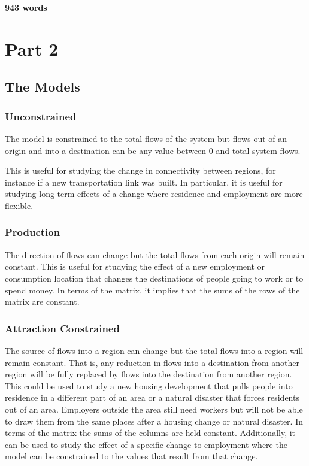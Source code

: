\documentclass[11pt]{article} %
\begin{document}
\textbf{943 words}


\pagebreak

\section{Part 2}

\subsection{The Models}

\subsubsection{Unconstrained}

The model is constrained to the total flows of the system but flows out of an origin and into a destination can be any value between 0 and total system flows. 

This is useful for studying the change in connectivity between regions, for instance if a new transportation link was built. In particular, it is useful for studying long term effects of a change where residence and employment are more flexible. 

\subsubsection{Production}

The direction of flows can change but the total flows from each origin will remain constant. This is useful for studying the effect of a new employment or consumption location that changes the destinations of people going to work or to spend money. In terms of the matrix, it implies that the sums of the rows of the matrix are constant. 

\subsubsection{Attraction Constrained}

The source of flows into a region can change but the total flows into a region will remain constant. That is, any reduction in flows into a destination from another region will be fully replaced by flows into the destination from another region.  This could be used to study a new housing development that pulls people into residence in a different part of an area or a natural disaster that forces residents out of an area. Employers outside the area still need workers but will not be able to draw them from the same places after a housing change or natural disaster. In terms of the matrix the sums of the columns are held constant. Additionally, it can be used to study the effect of a specific change to employment where the model can be constrained to the values that result from that change. 
\end{document}
